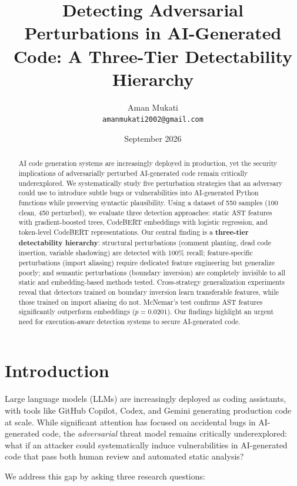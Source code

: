 \documentclass[11pt]{article}
\title{Detecting Adversarial Perturbations in AI-Generated Code: A Three-Tier Detectability Hierarchy}
\author{Aman Mukati\\
\texttt{amanmukati2002@gmail.com}
}
\date{September 2026}
\begin{document}
\maketitle

\begin{abstract}
AI code generation systems are increasingly deployed in production, yet the security implications of adversarially perturbed AI-generated code remain critically underexplored. We systematically study five perturbation strategies that an adversary could use to introduce subtle bugs or vulnerabilities into AI-generated Python functions while preserving syntactic plausibility. Using a dataset of 550 samples (100 clean, 450 perturbed), we evaluate three detection approaches: static AST features with gradient-boosted trees, CodeBERT embeddings with logistic regression, and token-level CodeBERT representations. Our central finding is a \textbf{three-tier detectability hierarchy}: structural perturbations (comment planting, dead code insertion, variable shadowing) are detected with 100\% recall; feature-specific perturbations (import aliasing) require dedicated feature engineering but generalize poorly; and semantic perturbations (boundary inversion) are completely invisible to all static and embedding-based methods tested. Cross-strategy generalization experiments reveal that detectors trained on boundary inversion learn transferable features, while those trained on import aliasing do not. McNemar's test confirms AST features significantly outperform embeddings ($p=0.0201$). Our findings highlight an urgent need for execution-aware detection systems to secure AI-generated code.
\end{abstract}

\section{Introduction}
\label{sec:intro}

Large language models (LLMs) are increasingly deployed as coding assistants, with tools like GitHub Copilot, Codex, and Gemini generating production code at scale. While significant attention has focused on accidental bugs in AI-generated code, the \textit{adversarial} threat model remains critically underexplored: what if an attacker could systematically induce vulnerabilities in AI-generated code that pass both human review and automated static analysis?

We address this gap by asking three research questions:
\end{document}
